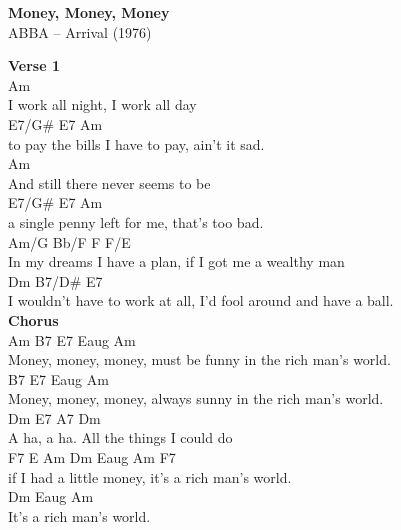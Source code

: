 \documentclass[a4paper]{article}
\begin{document}
    \begin{center}
        \textbf{Money, Money, Money}
        ~\\
        ABBA -- Arrival (1976)
    \end{center}
    {
        \scriptsize
        \textbf{Verse 1}
        ~\\
        {
            \cutive
            \obeyspaces
  Am
\\
I work all night, I work all day 
\\
   E7/G\#                     E7            Am
\\
to pay the bills I have to pay, ain't it sad. 
\\
    Am
\\
And still there never seems to be 
\\
  E7/G\#                  E7              Am
\\
a single penny left for me, that's too bad. 
\\
                          Am/G  Bb/F   F                 F/E
\\
In my dreams I have a plan,     if I got me a wealthy man 
\\
  Dm                                B7/D\#                    E7
\\
I wouldn't have to work at all, I'd fool around and have a ball. 
\\

        }
        \textbf{Chorus}
        ~\\
        {
            \cutive
            \obeyspaces
Am                   B7              E7       Eaug        Am
\\
Money, money, money,   must be funny   in the rich man's world. 
\\
                     B7             E7       Eaug        Am
\\
Money, money, money,   always sunny   in the rich man's world. 
\\
   Dm    E7  A7                        Dm
\\
A ha, a ha.    All the things I could do 
\\
F7 E Am                  Dm       Eaug        Am    F7
\\
if I had a little money,   it's a rich man's world. 
\\
Dm       Eaug        Am
\\
  It's a rich man's world.
\\

}}
\end{document}
